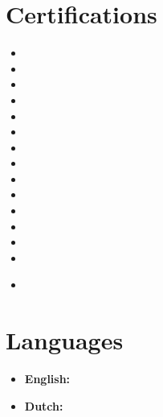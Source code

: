 \documentclass[11pt,a4paper]{article}
\begin{document}
\begin{itemize}[leftmargin=0pt,label={},itemsep=2em,topsep=0pt]
\vspace{0.5cm}
\section{Certifications}
\CertMicrosoftIntro
\begin{itemize}[leftmargin=*,topsep=-6pt,parsep=0pt,partopsep=0pt,itemsep=0pt]
\item \CertMicrosoftSpecificMCPDWinSecond
\item \CertMicrosoftSpecificMCPDAsure
\item \CertMicrosoftSpecificMCPDWebSecond
\item \CertMicrosoftSpecificMCPDWinFirst
\item \CertMicrosoftSpecificMCPDWebFirst
\item \CertMicrosoftSpecificMCTWinSecond
\item \CertMicrosoftSpecificMCTDataAccess
\item \CertMicrosoftSpecificMCTWebSecond
\item \CertMicrosoftSpecificMCTService
\item \CertMicrosoftSpecificMCTWinFirst
\item \CertMicrosoftSpecificMCTWebFirst
\item \CertMicrosoftSpecificMCSD
\item \CertMicrosoftSpecificMCAD
\item \CertMicrosoftSpecificMCP
\end{itemize}

\begin{itemize}[leftmargin=*]
\item \CertDutch
\end{itemize}


\vspace{0.5cm}
\section{Languages}
\begin{itemize}[leftmargin=*]
\item \textbf{English:} \LangEnglish
\item \textbf{Dutch:} \LangDutch
\end{itemize} 

\end{itemize}
\end{document}
